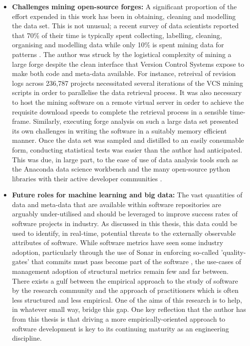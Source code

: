 \begin{itemize}
\item  \textbf{Challenges mining open-source forges: } A significant proportion of the effort expended in this work has been in obtaining, cleaning and modelling the data set. This is not unusual; a recent survey of data scientists reported that 70\% of their time is typically spent collecting, labelling, cleaning, organising and modelling data while only 10\% is spent mining data for patterns \citep{crowdflower}. The author was struck by the logistical complexity of mining a large forge despite the clean interface that Version Control Systems expose to make both code and meta-data available. For instance, retreival of revision logs across 236,787 projects necessitated several iterations of the VCS mining scripts in order to parallelise the data retrieval process. It was also necessary to host the mining software on a remote virtual server in order to achieve the requisite download speeds to complete the retrieval process in a sensible time-frame. Similarly, executing forge analysis on such a large data set presented its own challenges in writing the software in a suitably memory efficient manner. Once the data set was sampled and distilled to an easily consumable form, conducting statistical tests was easier than the author had anticipated. This was due, in large part, to the ease of use of data analysis tools such as the Anaconda data science workbench and the many open-source python libraries with their active developer communities \citep{anaconda}.

\item  \textbf{Future roles for machine learning and big data: } The vast quantities of data and meta-data that are available within software repositories are arguably under-utilised and should be leveraged to improve success rates of software projects in industry. As discussed in this thesis, this data could be used to identify, in real-time, potential threats to the externally observable attributes of software. While software metrics have seen some industry adoption, particularly through the use of Sonar  in enforcing so-called 'quality-gates' that commits must pass become part of the software \citep{ampatzoglou2018framework, sonar}, the use-cases of management adoption of  structural metrics remain few and far between. There exists a gulf between the empirical approach to the study of software by the research community and the approach of practitioners which is often less structured and less empirical. One of the aims of this research is to help, in whatever small way, bridge this gap. One key reflection that the author has from this thesis is that driving a more empirically-oriented approach to software development is key to its continuing maturity as an engineering discipline.


\end{itemize}
